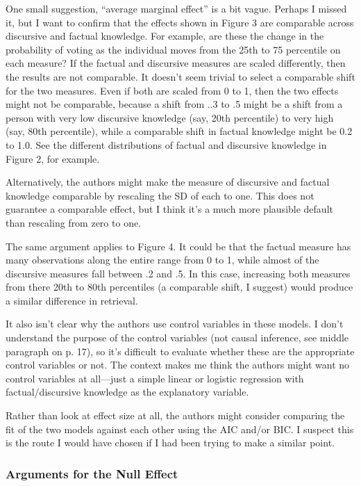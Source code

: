 One small suggestion, “average marginal effect” is a bit vague. Perhaps I missed it, but I want to confirm that the effects shown in Figure 3 are comparable across discursive and factual knowledge. For example, are these the change in the probability of voting as the individual moves from the 25th to 75 percentile on each measure? If the factual and discursive measures are scaled differently, then the results are not comparable. It doesn’t seem trivial to select a comparable shift for the two measures. Even if both are scaled from 0 to 1, then the two effects might not be comparable, because a shift from ..3 to .5 might be a shift from a person with very low discursive knowledge (say, 20th percentile) to very high (say, 80th percentile), while a comparable shift in factual knowledge might be 0.2 to 1.0. See the different distributions of factual and discursive knowledge in Figure 2, for example.

Alternatively, the authors might make the measure of discursive and factual knowledge comparable by rescaling the SD of each to one. This does not guarantee a comparable effect, but I think it’s a much more plausible default than rescaling from zero to one.

The same argument applies to Figure 4. It could be that the factual measure has many observations along the entire range from 0 to 1, while almost of the discursive measures fall between .2 and .5. In this case, increasing both measures from there 20th to 80th percentiles (a comparable shift, I suggest) would produce a similar difference in retrieval.

It also isn’t clear why the authors use control variables in these models. I don’t understand the purpose of the control variables (not causal inference, see middle paragraph on p. 17), so it’s difficult to evaluate whether these are the appropriate control variables or not. The context makes me think the authors might want no control variables at all—just a simple linear or logistic regression with factual/discursive knowledge as the explanatory variable.

Rather than look at effect size at all, the authors might consider comparing the fit of the two models against each other using the AIC and/or BIC. I suspect this is the route I would have chosen if I had been trying to make a similar point.

\subsubsection*{Arguments for the Null Effect}

